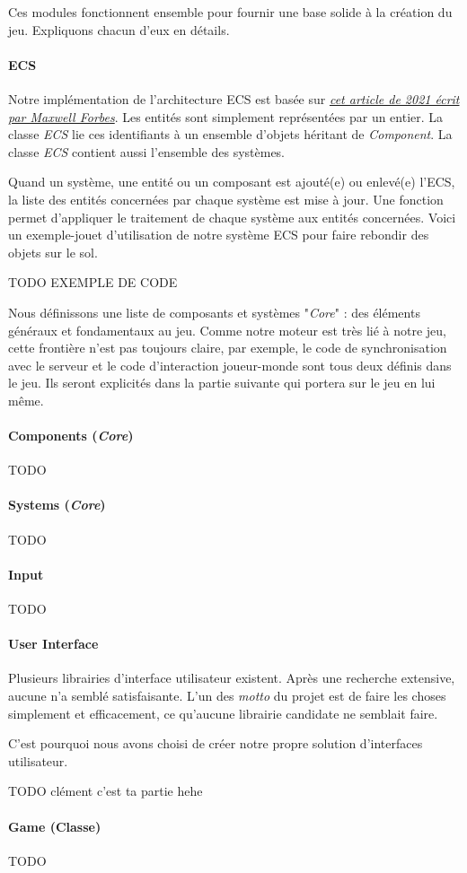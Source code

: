     Ces modules fonctionnent ensemble pour fournir une base solide à la création du jeu. Expliquons chacun d'eux en détails.
\paragraph{ECS}
    Notre implémentation de l'architecture ECS est basée sur \href{https://maxwellforbes.com/posts/typescript-ecs-implementation/}{\textit{cet article de 2021 écrit par Maxwell Forbes}}. Les entités sont simplement représentées par un entier. La classe \textit{ECS} lie ces identifiants à un ensemble d'objets héritant de \textit{Component}. La classe \textit{ECS} contient aussi l'ensemble des systèmes.
    
    Quand un système, une entité ou un composant est ajouté(e) ou enlevé(e) l'ECS, la liste des entités concernées par chaque système est mise à jour.
    Une fonction permet d'appliquer le traitement de chaque système aux entités concernées. Voici un exemple-jouet d'utilisation de notre système ECS pour faire rebondir des objets sur le sol.

    TODO EXEMPLE DE CODE


    Nous définissons une liste de composants et systèmes "\textit{Core}" : des éléments généraux et fondamentaux au jeu. Comme notre moteur est très lié à notre jeu, cette frontière n'est pas toujours claire, par exemple, le code de synchronisation avec le serveur et le code d’interaction joueur-monde sont tous deux définis dans le jeu. Ils seront explicités dans la partie suivante qui portera sur le jeu en lui même.
\paragraph{Components (\textit{Core})}
    TODO


\paragraph{Systems (\textit{Core})}
    TODO




\paragraph{Input}
    TODO
    
\paragraph{User Interface}
    Plusieurs librairies d'interface utilisateur existent. Après une recherche extensive, aucune n'a semblé satisfaisante. L'un des \textit{motto} du projet est de faire les choses simplement et efficacement, ce qu'aucune librairie candidate ne semblait faire.

    C'est pourquoi nous avons choisi de créer notre propre solution d'interfaces utilisateur.

    TODO clément c'est ta partie hehe

\paragraph{Game (Classe)}
    TODO